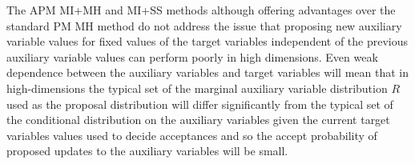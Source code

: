 The \ac{APM} \ac{MI}+\ac{MH} and \ac{MI}+\ac{SS} methods although offering advantages over the standard \ac{PM} \ac{MH} method do not address the issue that proposing new auxiliary variable values for fixed values of the target variables independent of the previous auxiliary variable values can perform poorly in high dimensions. Even weak dependence between the auxiliary variables and target variables will mean that in high-dimensions the typical set of the  marginal auxiliary variable distribution $R$ used as the proposal distribution will differ significantly from the typical set of the conditional distribution on the auxiliary variables given the current target variables values used to decide acceptances and so the accept probability of proposed updates to the auxiliary variables will be small. %


